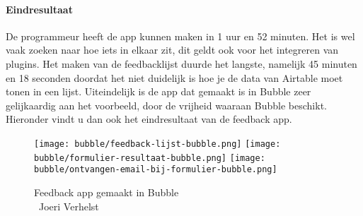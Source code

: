 \paragraph*{Eindresultaat}
De programmeur heeft de app kunnen maken in 1 uur en 52 minuten. Het is wel vaak zoeken naar hoe iets in elkaar zit, dit geldt ook voor het integreren van plugins.
Het maken van de feedbacklijst duurde het langste, namelijk 45 minuten en 18 seconden doordat het niet duidelijk is hoe je de data van Airtable moet tonen in een lijst.
Uiteindelijk is de app dat gemaakt is in Bubble zeer gelijkaardig aan het voorbeeld, door de vrijheid waaraan Bubble beschikt. Hieronder vindt u dan ook het eindresultaat van de feedback app.
\\
\begin{figure}[H]
    \texttt{[image: bubble/feedback-lijst-bubble.png]}
    \texttt{[image: bubble/formulier-resultaat-bubble.png]}
    \texttt{[image: bubble/ontvangen-email-bij-formulier-bubble.png]}
    \caption[Feedback app gemaakt in Bubble]{Feedback app gemaakt in Bubble\\\textcopyright\ Joeri Verhelst}
    \label{fig:feedback-app-bubble}
\end{figure}

